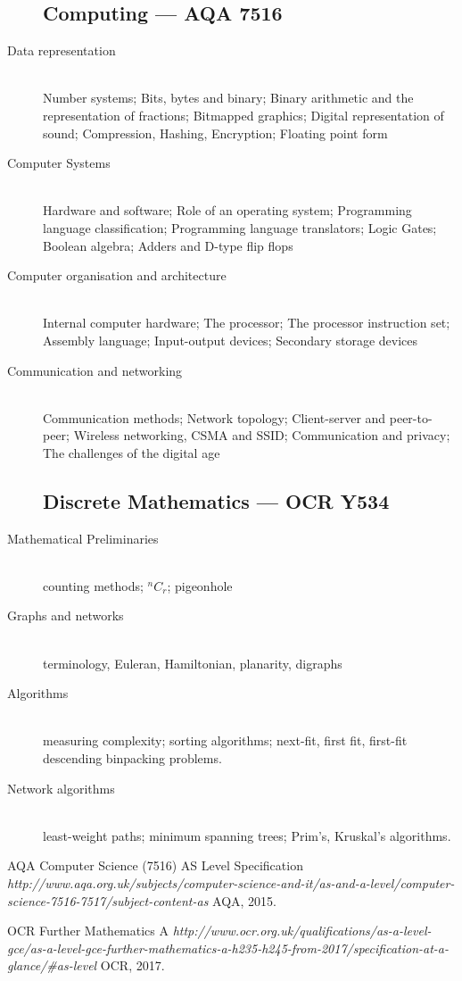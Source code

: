 \begin{description}
\subsection*{Computing --- AQA 7516}
\item[Data representation] \hfill \\
	Number systems; 
	Bits, bytes and binary;
	Binary arithmetic and the representation of fractions;
	Bitmapped graphics;
	Digital representation of sound;
	Compression, Hashing, Encryption;
	Floating point form
\item[Computer Systems] \hfill \\
	Hardware and software;
	Role of an operating system;
	Programming language classification;
	Programming language translators;
	Logic Gates;
	Boolean algebra; 
	Adders and D-type flip flops
\item[Computer organisation and architecture] \hfill \\
	Internal computer hardware;
	The processor;
	The processor instruction set;
	Assembly language;
	Input-output devices;
	Secondary storage devices
\item[Communication and networking] \hfill \\
	Communication methods;
	Network topology;
	Client-server and peer-to-peer;
	Wireless networking, CSMA and SSID;
	Communication and privacy;
	The challenges of the digital age
\subsection*{Discrete Mathematics --- OCR Y534}
\item [Mathematical Preliminaries] \hfill \\ counting methods; $^nC_r$; pigeonhole
\item [Graphs and networks] \hfill \\ terminology, Euleran, Hamiltonian, planarity, digraphs 
\item [Algorithms] \hfill \\ measuring complexity; sorting algorithms; next-fit, first fit, first-fit descending binpacking problems.  
\item [Network algorithms] \hfill \\ least-weight paths; minimum spanning trees; Prim's, Kruskal's algorithms.
\end{description}

\begin{thebibliography}{9}
AQA Computer Science (7516) AS Level Specification 
\textit{http://www.aqa.org.uk/subjects/computer-science-and-it/as-and-a-level/computer-science-7516-7517/subject-content-as}
AQA, 2015.
 
OCR Further Mathematics A 
\textit{http://www.ocr.org.uk/qualifications/as-a-level-gce/as-a-level-gce-further-mathematics-a-h235-h245-from-2017/specification-at-a-glance/\#as-level}
OCR, 2017. 
\end{thebibliography}

